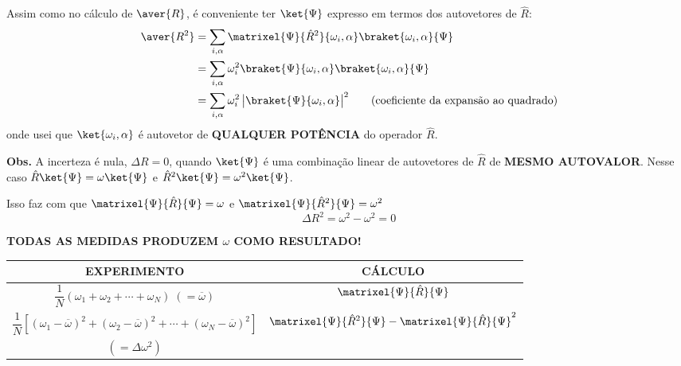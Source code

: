 Assim como no cálculo de $\aver{R}$, é conveniente ter $\ket{\Psi}$ expresso em termos dos autovetores de $\hat{R}$:
\begin{align}
    \aver{R^2} &= \sum_{i,\alpha} \matrixel{\Psi}{\hat{R}^2}{\omega_i,\alpha}\braket{\omega_i,\alpha}{\Psi} \notag \\
    &= \sum_{i,\alpha} \omega_i^2 \braket{\Psi}{\omega_i,\alpha}\braket{\omega_i,\alpha}{\Psi} \notag \\
    &= \sum_{i,\alpha} \omega_i^2 \,\big|\braket{\Psi}{\omega_i,\alpha}\big|^2 \qquad \text{(coeficiente da expansão ao quadrado)}
\label{eq:aula12_R2_expansao}
\end{align}
onde usei que $\ket{\omega_i,\alpha}$ é autovetor de \textbf{QUALQUER POTÊNCIA} do operador $\hat{R}$.

\textbf{Obs.} A incerteza é nula, $\Delta R = 0$, quando $\ket{\Psi}$ é uma combinação linear de autovetores de $\hat{R}$ de \textbf{MESMO AUTOVALOR}. Nesse caso $\hat{R}\ket{\Psi} = \omega\ket{\Psi}$ e $\hat{R}^2\ket{\Psi} = \omega^2\ket{\Psi}$.

Isso faz com que $\matrixel{\Psi}{\hat{R}}{\Psi} = \omega$ e $\matrixel{\Psi}{\hat{R}^2}{\Psi} = \omega^2$
\begin{equation}
    \Delta R^2 = \omega^2 - \omega^2 = 0
\label{eq:aula12_deltaR_nula}
\end{equation}

\textbf{TODAS AS MEDIDAS PRODUZEM $\omega$ COMO RESULTADO!}

\begin{center}
\begin{tabular}{c|c}
    \textbf{EXPERIMENTO} & \textbf{CÁLCULO} \\
    \hline
    $\dfrac{1}{N}(\omega_1+\omega_2+\cdots+\omega_N) \;(=\overline{\omega})$ & $\matrixel{\Psi}{\hat{R}}{\Psi}$ \\[3mm]
    $\dfrac{1}{N}\left[(\omega_1-\overline{\omega})^2+(\omega_2-\overline{\omega})^2+\cdots+(\omega_N-\overline{\omega})^2\right]$ & $\matrixel{\Psi}{\hat{R}^2}{\Psi} - \matrixel{\Psi}{\hat{R}}{\Psi}^2$ \\
    $(=\Delta\omega^2)$ &
\end{tabular}
\end{center}


